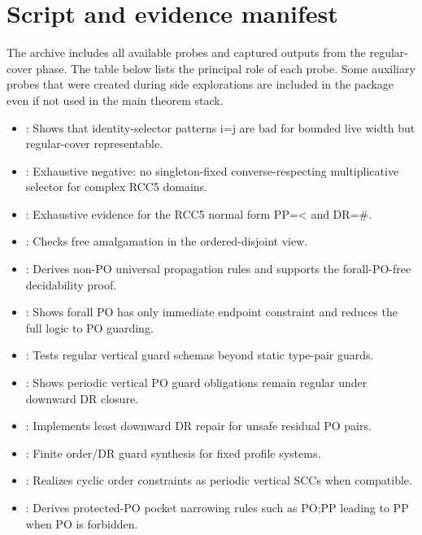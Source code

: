 \documentclass[11pt]{article}
\begin{document}
\section{Script and evidence manifest}

The archive includes all available probes and captured outputs from the regular-cover phase.  The table below lists the principal role of each probe.  Some auxiliary probes that were created during side explorations are included in the package even if not used in the main theorem stack.

\begin{itemize}
\small
\item {}: Shows that identity-selector patterns i=j are bad for bounded live width but regular-cover representable.
\item {}: Exhaustive negative: no singleton-fixed converse-respecting multiplicative selector for complex RCC5 domains.
\item {}: Exhaustive evidence for the RCC5 normal form PP=< and DR=\#.
\item {}: Checks free amalgamation in the ordered-disjoint view.
\item {}: Derives non-PO universal propagation rules and supports the forall-PO-free decidability proof.
\item {}: Shows forall PO has only immediate endpoint constraint and reduces the full logic to PO guarding.
\item {}: Tests regular vertical guard schemas beyond static type-pair guards.
\item {}: Shows periodic vertical PO guard obligations remain regular under downward DR closure.
\item {}: Implements least downward DR repair for unsafe residual PO pairs.
\item {}: Finite order/DR guard synthesis for fixed profile systems.
\item {}: Realizes cyclic order constraints as periodic vertical SCCs when compatible.
\item {}: Derives protected-PO pocket narrowing rules such as PO;PP leading to PP when PO is forbidden.

\end{itemize}
\end{document}
